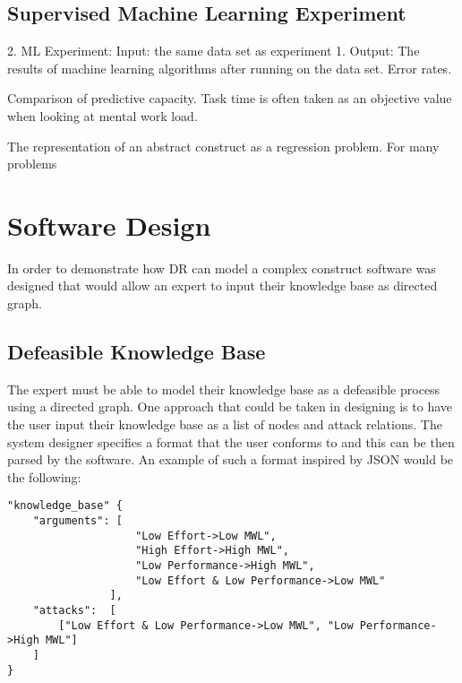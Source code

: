 \subsection{Supervised Machine Learning Experiment}


2. ML Experiment: Input: the same data set as experiment 1.
Output: The results of machine learning algorithms after running on the data set. Error rates.

Comparison of predictive capacity.
Task time is often taken as an objective value when looking at mental work load.

The representation of an abstract construct as a regression problem. For many problems 






\section{Software Design}

In order to demonstrate how DR can model a complex construct software was designed that would allow an expert to input their knowledge base as directed graph.
\subsection{Defeasible Knowledge Base}
The expert must be able to model their knowledge base as a defeasible process using a directed graph. One approach that could be taken in designing is to have the user input their knowledge base as a list of nodes and attack relations. The system designer specifies a format that the user conforms to and this can be then parsed by the software. An example of such a format inspired by JSON would be the following:

\begin{lstlisting}
"knowledge_base" {
    "arguments": [
                    "Low Effort->Low MWL", 
                    "High Effort->High MWL", 
                    "Low Performance->High MWL", 
                    "Low Effort & Low Performance->Low MWL"
                ],
    "attacks":  [
        ["Low Effort & Low Performance->Low MWL", "Low Performance->High MWL"]
    ]
}
\end{lstlisting}

